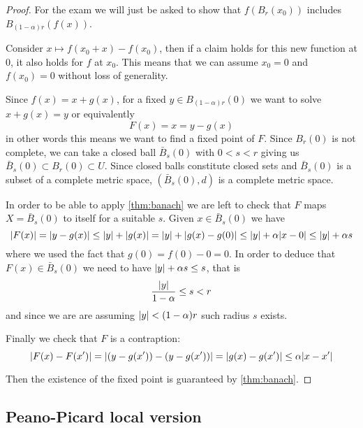 \documentclass[12pt]{extarticle}
\begin{document}
\begin{proof}
    For the exam we will just be asked to show that $f(B_r(x_0))$ includes $B_{(1-\alpha)r}(f(x))$.

    Consider $x \mapsto f(x_0 + x) - f(x_0)$, then if a claim holds for this new function at $0$, it also holds for $f$ at $x_0$.
    This means that we can assume $x_0 = 0$ and $f(x_0) =0$ without loss of generality.

    Since $f(x) = x + g(x)$, for a fixed $y \in B_{(1-\alpha)r}(0)$ we want to solve $x + g(x) = y$ or equivalently
    \begin{equation}
        F(x) = x = y-g(x)
    \end{equation}
    in other words this means we want to find a fixed point of $F$.
    Since $B_r(0)$ is not complete, we can take a closed ball $\bar B_s(0)$ with $0 < s< r$ giving us
    $\bar B_s(0) \subset B_r(0) \subset U$.
    Since closed balls constitute closed sets and $\bar B_s(0)$ is a subset of a complete metric space,
    $(\bar B_s(0), d)$ is a complete metric space.

    In order to be able to apply \cref{thm:banach} we are left to check that $F$ maps $X = \bar B_s(0)$ to itself
    for a suitable $s$.
    Given $x \in \bar B_s(0)$ we have
    \begin{equation}
        \abs{F(x)} = \abs{y - g(x)} \leq \abs{y} + \abs{g(x)} =  \abs{y} + \abs{g(x) - g(0)} \leq \abs{y} + \alpha \abs{x - 0} \leq \abs{y} + \alpha s
    \end{equation}
    where we used the fact that $g(0) = f(0) - 0 = 0$.
    In order to deduce that $F(x) \in \bar B_s (0)$ we need to have $\abs{y} + \alpha s \leq s$, that is
    \begin{equation}
        \frac{\abs{y}}{1-\alpha} \leq s < r
    \end{equation}
    and since we are are assuming $\abs{y} < (1-\alpha) r$ such radius $s$ exists.

    Finally we check that $F$ is a contraption:
    \begin{equation}
        \abs{F(x) - F(x')} = \abs{(y-g(x')) - (y-g(x'))} = \abs{g(x)-g(x')} \leq \alpha \abs{x-x'}
    \end{equation}

    Then the existence of the fixed point is guaranteed by \cref{thm:banach}.
\end{proof}

\subsection{Peano-Picard local version}
\end{document}
